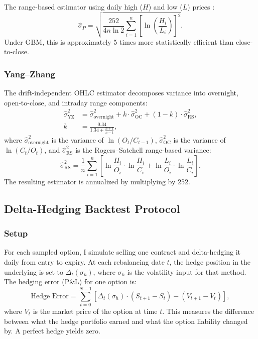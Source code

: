 \documentclass[12pt, letterpaper]{article}
\begin{document}
The range-based estimator using daily high ($H$) and low ($L$) prices \citep{Parkinson1980}:
\begin{equation}
    \hat{\sigma}_P = \sqrt{\frac{252}{4n\ln 2} \sum_{i=1}^{n} \left[\ln\left(\frac{H_i}{L_i}\right)\right]^2}.
    \label{eq:rv_park}
\end{equation}
Under GBM, this is approximately 5 times more statistically efficient than close-to-close.

\subsubsection{Yang--Zhang}

The drift-independent OHLC estimator \citep{Yang2000} decomposes variance into overnight, open-to-close, and intraday range components:
\begin{align}
    \hat{\sigma}_{\text{YZ}}^2 &= \hat{\sigma}_{\text{overnight}}^2 + k \cdot \hat{\sigma}_{\text{OC}}^2 + (1 - k) \cdot \hat{\sigma}_{\text{RS}}^2, \label{eq:rv_yz} \\
    k &= \frac{0.34}{1.34 + \frac{n + 1}{n - 1}}, \nonumber
\end{align}
where $\hat{\sigma}_{\text{overnight}}^2$ is the variance of $\ln(O_t / C_{t-1})$, $\hat{\sigma}_{\text{OC}}^2$ is the variance of $\ln(C_t / O_t)$, and $\hat{\sigma}_{\text{RS}}^2$ is the Rogers--Satchell range-based variance:
\begin{equation}
    \hat{\sigma}_{\text{RS}}^2 = \frac{1}{n}\sum_{i=1}^{n}\left[\ln\frac{H_i}{O_i}\cdot\ln\frac{H_i}{C_i} + \ln\frac{L_i}{O_i}\cdot\ln\frac{L_i}{C_i}\right].
    \label{eq:rogers_satchell}
\end{equation}
The resulting estimator is annualized by multiplying by 252.

\subsection{Delta-Hedging Backtest Protocol}
\label{sec:hedging_protocol}

\subsubsection{Setup}

For each sampled option, I simulate selling one contract and delta-hedging it daily from entry to expiry. At each rebalancing date $t$, the hedge position in the underlying is set to $\Delta_t(\sigma_h)$, where $\sigma_h$ is the volatility input for that method. The hedging error (P\&L) for one option is:
\begin{equation}
    \text{Hedge Error} = \sum_{t=0}^{N-1} \left[\Delta_t(\sigma_h) \cdot (S_{t+1} - S_t) - (V_{t+1} - V_t)\right],
    \label{eq:hedge_error}
\end{equation}
where $V_t$ is the market price of the option at time $t$. This measures the difference between what the hedge portfolio earned and what the option liability changed by. A perfect hedge yields zero.
\end{document}
